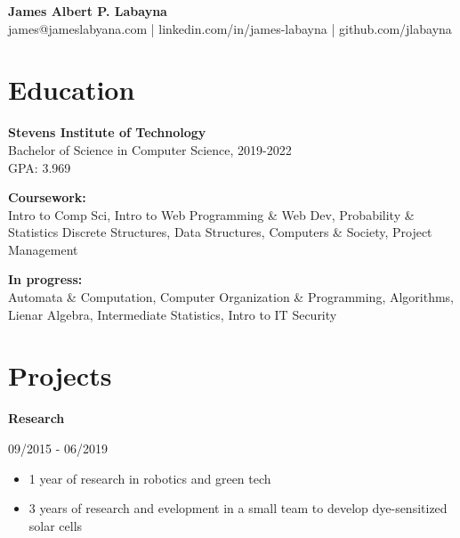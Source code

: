 \documentclass[11pt,letterpaper]{article}
\begin{document}
  \begin{center}
    \textbf{James Albert P. Labayna} \\
    \small james@jameslabyana.com | linkedin.com/in/james-labayna | github.com/jlabayna
  \end{center}
  
  \iffalse
  \begin{minipage}[t]{2in}
    \textbf{Present Address:} \\
    205 Hudson St, Apt. 602 \\
    Hoboken, NJ 07030 \\
    201.256.7526
  \end{minipage}
  \hfill
  \begin{minipage}[t]{2.4in}
    \textbf{Permanent Address:} \\
    294 S. Washington Ave., Apt. 87 \\
    Bergenfield, NJ 07030
  \end{minipage}
  \fi
  
  \section{Education}
    \textbf{Stevens Institute of Technology} \\
    Bachelor of Science in Computer Science, 2019-2022 \\
    GPA: 3.969
    
    \noindent\textbf{Coursework:}\\
    Intro to Comp Sci, Intro to Web Programming \& Web Dev, Probability \& Statistics Discrete Structures, Data Structures, Computers \& Society, Project Management
    
    \textbf{In progress:}\\
    Automata \& Computation, Computer Organization \& Programming, Algorithms, Lienar Algebra, Intermediate Statistics, Intro to IT Security

  \section{Projects}
    \textbf{Research}\hfill
    \begin{minipage}[t]{1.2in}
      09/2015 - 06/2019
    \end{minipage}
    
      \begin{itemize}
        \item 1 year of research in robotics and green tech
        \item 3 years of research and evelopment in a small team to develop dye-sensitized solar cells
      \end{itemize}
    
\end{document}
